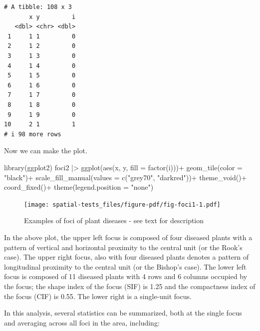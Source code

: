\documentclass[
  letterpaper,
]{book}
\newenvironment{Shaded}{\begin{snugshade}}{\end{snugshade}}
\newcommand{\AttributeTok}[1]{\textcolor[rgb]{0.40,0.45,0.13}{#1}}
\newcommand{\FunctionTok}[1]{\textcolor[rgb]{0.28,0.35,0.67}{#1}}
\newcommand{\NormalTok}[1]{\textcolor[rgb]{0.00,0.23,0.31}{#1}}
\newcommand{\SpecialCharTok}[1]{\textcolor[rgb]{0.37,0.37,0.37}{#1}}
\newcommand{\StringTok}[1]{\textcolor[rgb]{0.13,0.47,0.30}{#1}}
\begin{document}
\begin{verbatim}
# A tibble: 108 x 3
       x y         i
   <dbl> <chr> <dbl>
 1     1 1         0
 2     1 2         0
 3     1 3         0
 4     1 4         0
 5     1 5         0
 6     1 6         0
 7     1 7         0
 8     1 8         0
 9     1 9         0
10     2 1         1
# i 98 more rows
\end{verbatim}

Now we can make the plot.

\begin{Shaded}
\begin{Highlighting}[]
\FunctionTok{library}\NormalTok{(ggplot2)}
\NormalTok{foci2 }\SpecialCharTok{|\textgreater{}} 
  \FunctionTok{ggplot}\NormalTok{(}\FunctionTok{aes}\NormalTok{(x, y, }\AttributeTok{fill =} \FunctionTok{factor}\NormalTok{(i)))}\SpecialCharTok{+}
  \FunctionTok{geom\_tile}\NormalTok{(}\AttributeTok{color =} \StringTok{"black"}\NormalTok{)}\SpecialCharTok{+}
  \FunctionTok{scale\_fill\_manual}\NormalTok{(}\AttributeTok{values =} \FunctionTok{c}\NormalTok{(}\StringTok{"grey70"}\NormalTok{, }\StringTok{"darkred"}\NormalTok{))}\SpecialCharTok{+}
  \FunctionTok{theme\_void}\NormalTok{()}\SpecialCharTok{+}
  \FunctionTok{coord\_fixed}\NormalTok{()}\SpecialCharTok{+}
  \FunctionTok{theme}\NormalTok{(}\AttributeTok{legend.position =} \StringTok{"none"}\NormalTok{)}
\end{Highlighting}
\end{Shaded}

\begin{figure}[H]

\texttt{[image: spatial-tests\_files/figure-pdf/fig-foci1-1.pdf]} \hfill{}

\caption{\label{fig-foci1}Examples of foci of plant diseases - see text
for description}

\end{figure}

In the above plot, the upper left focus is composed of four diseased
plants with a pattern of vertical and horizontal proximity to the
central unit (or the Rook's case). The upper right focus, also with four
diseased plants denotes a pattern of longitudinal proximity to the
central unit (or the Bishop's case). The lower left focus is composed of
11 diseased plants with 4 rows and 6 columns occupied by the focus; the
shape index of the focus (SIF) is 1.25 and the compactness index of the
focus (CIF) is 0.55. The lower right is a single-unit focus.

In this analysis, several statistics can be summarized, both at the
single focus and averaging across all foci in the area, including:
\end{document}
